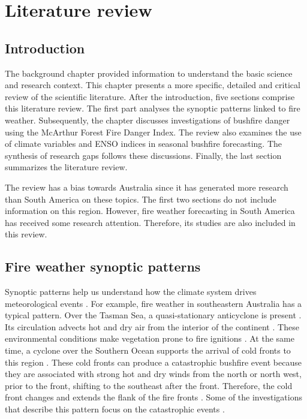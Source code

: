 
\chapter{Literature review}
\newpage{}


\section{Introduction}

The background chapter provided information to understand the basic
science and research context. This chapter presents a more specific,
detailed and critical review of the scientific literature. After the
introduction, five sections comprise this literature review. The first
part analyses the synoptic patterns linked to fire weather. Subsequently,
the chapter discusses investigations of bushfire danger using the
McArthur Forest Fire Danger Index. The review also examines the use
of climate variables and ENSO indices in seasonal bushfire forecasting.
The synthesis of research gaps follows these discussions. Finally,
the last section summarizes the literature review. 

The review has a bias towards Australia since it has generated more
research than South America on these topics. The first two sections
do not include information on this region. However, fire weather forecasting
in South America has received some research attention. Therefore,
its studies are also included in this review.


\section{Fire weather synoptic patterns }

Synoptic patterns help us understand how the climate system drives
meteorological events \citep{Sturman2006}. For example, fire weather
in southeastern Australia has a typical pattern. Over the Tasman Sea,
a quasi-stationary anticyclone is present \citep{BoM2009}. Its circulation
advects hot and dry air from the interior of the continent \citep{Mills2005,Engel2013,Reeder2015}.
These environmental conditions make vegetation prone to fire ignitions
\citep{Williams2012}. At the same time, a cyclone over the Southern
Ocean supports the arrival of cold fronts to this region \citep{Reeder1987}.
These cold fronts can produce a catastrophic bushfire event because
they are associated with strong hot and dry winds from the north or north west, 
prior to the front, shifting to the southeast after the front. Therefore, the cold front changes and extends 
the flank of the fire fronts \citep{Mills2005,Engel2013,Reeder2015}.
Some of the investigations that describe this pattern focus on the
catastrophic events \citep{Mills2005,Mills2005a,Cruz2012,Engel2013,Fiddes2015,Reeder2015}.

